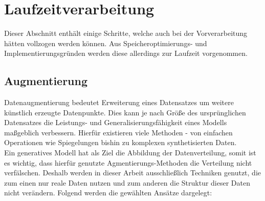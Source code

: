 \section{Laufzeitverarbeitung}

Dieser Abschnitt enthält einige Schritte, welche auch bei der Vorverarbeitung hätten vollzogen werden können. Aus Speicheroptimierungs- und Implementierungsgründen werden diese allerdings zur Laufzeit vorgenommen.


\subsection{Augmentierung}
\label{subsec:Augmentierung}

Datenaugmentierung bedeutet Erweiterung eines Datensatzes um weitere künstlich erzeugte Datenpunkte. Dies kann je nach Größe des ursprünglichen Datensatzes die Leistungs- und Generalisierungsfähigkeit eines Modells maßgeblich verbessern. Hierfür existieren viele Methoden - von einfachen Operationen wie Spiegelungen bishin zu komplexen synthetisierten Daten. \\
Ein generatives Modell hat als Ziel die Abbildung der Datenverteilung, somit ist es wichtig, dass hierfür genutzte Agmentierungs-Methoden die Verteilung nicht verfälschen. Deshalb werden in dieser Arbeit ausschließlich Techniken genutzt, die zum einen nur reale Daten nutzen und zum anderen die Struktur dieser Daten nicht verändern. Folgend werden die gewählten Ansätze dargelegt:

